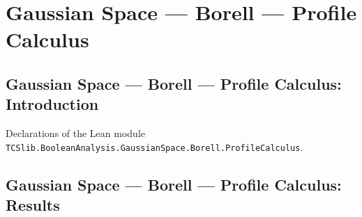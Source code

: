 \section{Gaussian Space --- Borell --- Profile Calculus}
\subsection*{Gaussian Space --- Borell --- Profile Calculus: Introduction}

Declarations of the Lean module \texttt{TCSlib.BooleanAnalysis.GaussianSpace.Borell.ProfileCalculus}.

\subsection*{Gaussian Space --- Borell --- Profile Calculus: Results}

